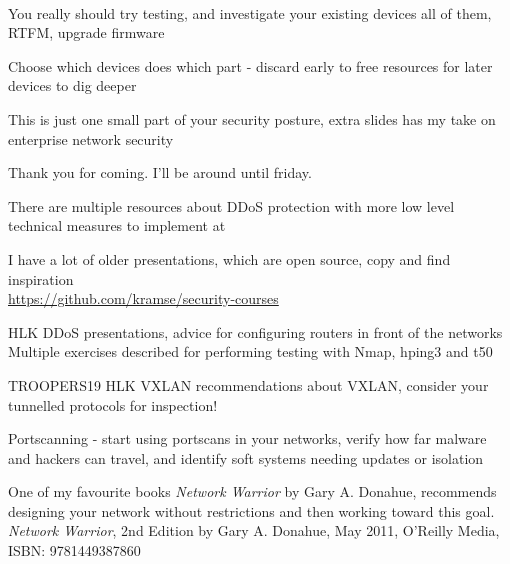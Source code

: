 \documentclass[Screen16to9,17pt]{foils}
\begin{document}

~
\begin{list2}
\item You really should try testing, and investigate your existing devices
all of them, RTFM, upgrade firmware
\item Choose which devices does which
part - discard early to free resources for later devices to dig deeper
\item This is just one small part of your security posture, extra slides has my take on enterprise network security
\end{list2}

\myquestionspage


Thank you for coming. I'll be around until friday.

There are multiple resources about DDoS protection with more low level technical measures to implement at\\
{\footnotesize {}}


I have a lot of older presentations, which are open source, copy and find inspiration\\
\url{https://github.com/kramse/security-courses}

\begin{list2}
\item HLK DDoS presentations, advice for configuring routers in front of the networks\\
Multiple exercises described for performing testing with Nmap, hping3 and t50
\item TROOPERS19 HLK VXLAN recommendations about VXLAN, consider your tunnelled protocols for inspection!
\item Portscanning - start using portscans in your networks, verify how far malware and hackers can travel, and identify soft systems needing updates or isolation
\end{list2}

One of my favourite books \emph{Network Warrior} by Gary A. Donahue, recommends designing your network without restrictions and then working toward this goal.\\
{\footnotesize \emph{Network Warrior}, 2nd Edition
by Gary A. Donahue, May 2011, O'Reilly Media, ISBN: 9781449387860}


\end{document}
